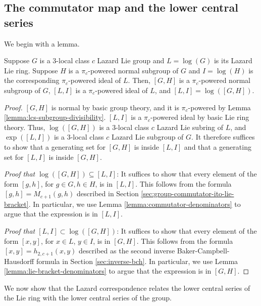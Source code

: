 \documentclass{ucetd}
\begin{document}
\subsection{The commutator map and the lower central series}

We begin with a lemma.

\begin{lemma}\label{lemma:derived-subgroup-same-group-lie-ring}
  Suppose $G$ is a $3$-local class $c$ Lazard Lie group and $L =
  \log(G)$ is its Lazard Lie ring. Suppose $H$ is a $\pi_c$-powered
  normal subgroup of $G$ and $I = \log(H)$ is the corresponding
  $\pi_c$-powered ideal of $L$. Then, $[G,H]$ is a $\pi_c$-powered
  normal subgroup of $G$, $[L,I]$ is a $\pi_c$-powered ideal of $L$,
  and $[L,I] = \log([G,H])$.
\end{lemma}

\begin{proof}
  $[G,H]$ is normal by basic group theory, and it is $\pi_c$-powered
  by Lemma \ref{lemma:lcs-subgroup-divisibility}. $[L,I]$ is a
  $\pi_c$-powered ideal by basic Lie ring theory. Thus, $\log([G,H])$
  is a $3$-local class $c$ Lazard Lie subring of $L$, and
  $\exp([L,I])$ is a $3$-local class $c$ Lazard Lie subgroup of
  $G$. It therefore suffices to show that a generating set for $[G,H]$
  is inside $[L,I]$ and that a generating set for $[L,I]$ is inside
  $[G,H]$.

  {\em Proof that $\log([G,H]) \subseteq [L,I]$}: It suffices to show
  that every element of the form $[g,h]$, for $g \in G, h \in H$, is in
  $[L,I]$. This follows from the formula $[g,h] = M_{c+1}(g,h)$
  described in Section \ref{sec:group-commutator-ito-lie-bracket}. In
  particular, we use Lemma \ref{lemma:commutator-denominators} to
  argue that the expression is in $[L,I]$.

  {\em Proof that $[L,I] \subset \log([G,H])$}: It suffices to show
  that every element of the form $[x,y]$, for $x \in L$, $y \in I$, is
  in $[G,H]$. This follows from the formula $[x,y] = h_{2,c+1}(x,y)$
  described as the second inverse Baker-Campbell-Hausdorff formula in
  Section \ref{sec:inverse-bch}. In particular, we use Lemma
  \ref{lemma:lie-bracket-denominators} to argue that the expression is
  in $[G,H]$.
\end{proof}

We now show that the Lazard correspondence relates the lower central
series of the Lie ring with the lower central series of the group.
\end{document}
